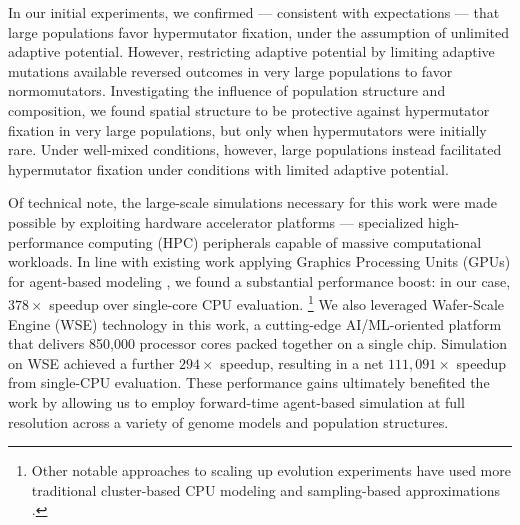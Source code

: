 In our initial experiments, we confirmed --- consistent with expectations --- that large populations favor hypermutator fixation, under the assumption of unlimited adaptive potential.
However, restricting adaptive potential by limiting adaptive mutations available reversed outcomes in very large populations to favor normomutators.
Investigating the influence of population structure and composition, we found spatial structure to be protective against hypermutator fixation in very large populations, but only when hypermutators were initially rare.
Under well-mixed conditions, however, large populations instead facilitated hypermutator fixation under conditions with limited adaptive potential.

Of technical note, the large-scale simulations necessary for this work were made possible by exploiting hardware accelerator platforms --- specialized high-performance computing (HPC) peripherals capable of massive computational workloads.
In line with existing work applying Graphics Processing Units (GPUs) for agent-based modeling \citep{turpin2021xaevol,kosiachenko2019mass,perumalla2009switching,heinemann2007artificial,richmond2023flame}, we found a substantial performance boost: in our case, $378\times$ speedup over single-core CPU evaluation.
\footnote{%
Other notable approaches to scaling up evolution experiments have used more traditional cluster-based CPU modeling \citep{moreno2022best,collier2015large,ray1995proposal,turpin2020paevol} and sampling-based approximations \citep{taddei1997role}.
}
We also leveraged Wafer-Scale Engine (WSE) technology in this work, a cutting-edge AI/ML-oriented platform that delivers 850,000 processor cores packed together on a single chip.
Simulation on WSE achieved a further $294\times$ speedup, resulting in a net $111{,}091\times$ speedup from single-CPU evaluation.
These performance gains ultimately benefited the work by allowing us to employ forward-time agent-based simulation at full resolution across a variety of genome models and population structures.
